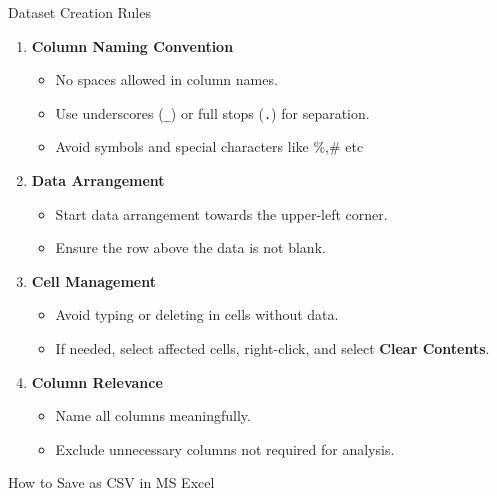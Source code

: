 \documentclass[
  letterpaper,
  DIV=11,
  numbers=noendperiod]{scrartcl}
\providecommand{\tightlist}{%
  \setlength{\itemsep}{0pt}\setlength{\parskip}{0pt}}\usepackage{longtable,booktabs,array}
\begin{document}
Dataset Creation Rules

\begin{enumerate}
\def\labelenumi{\arabic{enumi}.}
\tightlist
\item
  \textbf{Column Naming Convention}

  \begin{itemize}
  \tightlist
  \item
    No spaces allowed in column names.\\
  \item
    Use underscores (\texttt{\_}) or full stops (\texttt{.}) for
    separation.
  \item
    Avoid symbols and special characters like \%,\# etc
  \end{itemize}
\item
  \textbf{Data Arrangement}

  \begin{itemize}
  \tightlist
  \item
    Start data arrangement towards the upper-left corner.\\
  \item
    Ensure the row above the data is not blank.
  \end{itemize}
\item
  \textbf{Cell Management}

  \begin{itemize}
  \tightlist
  \item
    Avoid typing or deleting in cells without data.\\
  \item
    If needed, select affected cells, right-click, and select
    \textbf{Clear Contents}.
  \end{itemize}
\item
  \textbf{Column Relevance}

  \begin{itemize}
  \tightlist
  \item
    Name all columns meaningfully.\\
  \item
    Exclude unnecessary columns not required for analysis.
  \end{itemize}
\end{enumerate}

How to Save as CSV in MS Excel
\end{document}
